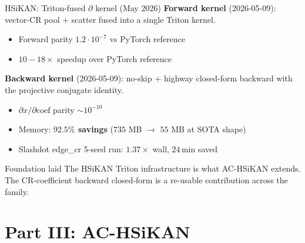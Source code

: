 \documentclass[aspectratio=169, 11pt]{beamer}
\begin{document}
\begin{frame}{HSiKAN: Triton-fused $\partial$ kernel (May 2026)}
  \textbf{Forward kernel} (2026-05-09): vector-CR pool $+$ scatter
  fused into a single Triton kernel.
  \begin{itemize}
  \item Forward parity $1.2 \cdot 10^{-7}$ vs PyTorch reference
  \item $10-18\times$ speedup over PyTorch reference
  \end{itemize}

  \vspace{2mm}
  \textbf{Backward kernel} (2026-05-09): no-skip + highway closed-form
  backward with the projective conjugate identity.
  \begin{itemize}
  \item $\partial x / \partial \mathrm{coef}$ parity $\sim 10^{-10}$
  \item Memory: \textbf{$92.5\%$ savings} ($735$ MB $\to$ $55$ MB
        at SOTA shape)
  \item Slashdot edge\_cr 5-seed run: $1.37\times$ wall, $24$\,min saved
  \end{itemize}

  \begin{block}{Foundation laid}
    The HSiKAN Triton infrastructure is what AC-HSiKAN extends. The
    CR-coefficient backward closed-form is a re-usable contribution
    across the family.
  \end{block}
\end{frame}

\section{Part III: AC-HSiKAN}
\end{document}
